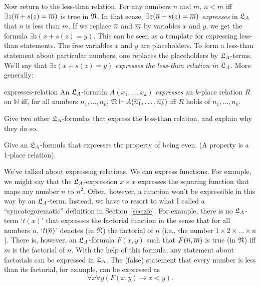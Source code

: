 Now return to the less-than relation.
For any numbers $n$ and $m$,
$n < m$ iff $\exists z(\overline{n} + s(z) = \overline{m})$ is true in $\mathfrak{N}$.
In that sense,
$\exists z(\overline{n} + s(z) = \overline{m})$ \emph{expresses} in $\mathfrak{L}_{A}$ that $n$ is less than $m$.
If we replace $\overline{n}$ and $\overline{m}$ by variables $x$ and $y$,
we get the formula $\exists z(x + s(z) = y)$.
This can be seen as a template
for expressing less-than statements.
The free variables $x$ and $y$ are placeholders.
To form a less-than statement about particular numbers,
one replaces the placeholders by $\mathfrak{L}_{A}$-terms.
We'll say that $\exists z(x + s(z) = y)$ \emph{expresses the less-than relation in $\mathfrak{L}_{A}$}.
More generally:

\begin{definition}{}{expresses-relation}
  An $\mathfrak{L}_{A}$-formula $A(x_{1},\ldots,x_{k})$ \emph{expresses} an $k$-place relation $R$ on $\mathbb{N}$ iff,
  for all numbers $n_{1},\ldots,n_{k}$,
  $\mathfrak{N} \Vdash A(\overline{n_{1}},\ldots,\overline{n_{k}})$ iff
  $R$ holds of $n_{1},\ldots,n_{k}$.
\end{definition}

\begin{exercise}
  Give two other $\mathfrak{L}_A$-formulas that express the less-than relation,
  and explain why they do so.
\end{exercise}

\begin{exercise}
  Give an $\mathfrak{L}_A$-formula that expresses the property of being even.
  (A property is a 1-place relation).
\end{exercise}

We've talked about expressing relations.
We can express functions.
For example,
we might say that the $\mathfrak{L}_A$-expression $x \times x$ expresses the squaring function
that maps any number $n$ to $n^2$.
Often,
however,
a function won't be expressible in this way by an $\mathfrak{L}_{A}$-term.
Instead,
we have to resort to what I called a ``syncategorematic'' definition in Section~\ref{sec:zfc}.
For example,
there is no $\mathfrak{L}_{A}$-term `$t(x)$' that expresses the factorial function
in the sense that
for all numbers $n$,
`$t(\overline{n})$' denotes (in $\mathfrak{N}$) the factorial of $n$
(i.e., the number $1 \times 2 \times \ldots \times n$).
There is,
however,
an $\mathfrak{L}_{A}$-formula $F(x,y)$
such that
$F(\overline{n},\overline{m})$ is true (in $\mathfrak{N}$) iff $m$ is the factorial of $n$.
With the help of this formula,
any statement about factorials can be expressed in $\mathfrak{L}_{A}$.
The (false) statement that every number is less than its factorial, for example, can be expressed as
\[
  \forall x \forall y(F(x,y) \to x < y).
\]

